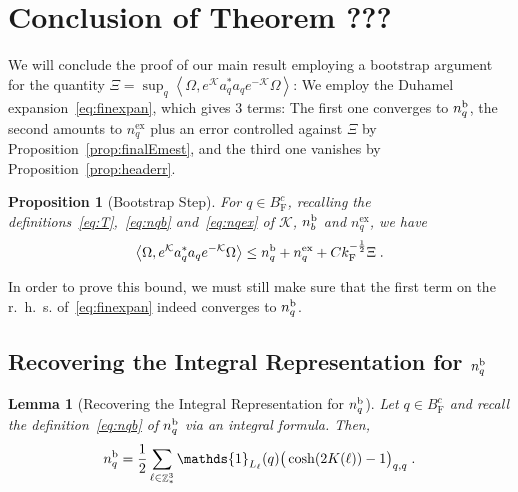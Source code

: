 \documentclass[12pt,a4paper]{article}
\numberwithin{equation}{section}
\newcommand{\cK}{\mathcal{K}}
\newcommand{\1}{\mathbb{I}}
\renewcommand{\b}{\textnormal{b}}
\newcommand{\ex}{\mathrm{ex}}
\newcommand{\F}{\mathrm{F}}
\DeclareMathOperator{\Z}{\mathbb{Z}}
\newcommand{\half}{\frac{1}{2}}
\newcommand{\eva}[1]{\left\langle #1 \right\rangle}
\theoremstyle{plain}
\newtheorem{lemma}[theorem]{Lemma}
\newtheorem{proposition}[theorem]{Proposition}
\theoremstyle{definition}
\theoremstyle{remark}
\theoremstyle{plain}
\theoremstyle{definition}
\theoremstyle{remark}
\begin{document}


\section{Conclusion of Theorem ???}

We will conclude the proof of our main result employing a bootstrap argument for the quantity $ \Xi = \sup_q \eva{\Omega, e^{\cK} a_q^* a_q e^{-\cK} \Omega}  $: We employ the Duhamel expansion~\eqref{eq:finexpan}, which gives 3 terms: The first one converges to $ n_q^{\b} $, the second amounts to $ n_q^{\ex} $ plus an error controlled against $ \Xi $ by Proposition~\ref{prop:finalEmest}, and the third one vanishes by Proposition~\ref{prop:headerr}.

\begin{proposition}[Bootstrap Step] \label{prop:bootstrap}
For $q \in B^c_{\F}$, recalling the definitions~\eqref{eq:T},~\eqref{eq:nqb} and~\eqref{eq:nqex} of $ \cK $, $ n_b^{\b} $ and $ n_q^{\ex} $, we have
\begin{equation} \label{eq:bootstrap}
	\eva{\Omega, e^{\cK} a_q^* a_q e^{-\cK} \Omega} 
	\le n_q^{\b} + n_q^{\ex} + C k_{\F}^{-\half} \Xi \;.
\end{equation} 
\end{proposition} 

In order to prove this bound, we must still make sure that the first term on the r.~h.~s. of~\eqref{eq:finexpan} indeed converges to $ n_q^{\b} $.


\subsection{Recovering the Integral Representation for $ n_q^{\b} $}

\begin{lemma}[Recovering the Integral Representation for $ n_q^{\b} $] \label{lem:nqb_integralrecovery}
Let $q \in B^c_{\F}$ and recall the definition~\eqref{eq:nqb} of $ n_q^{\b} $ via an integral formula. Then,
\begin{equation} \label{eq:nqb_integralrecovery}
	n_q^{\b} = \half\sum\limits_{\ell\in \Z^3_*}\mathds{1}_{L_\ell}(q) \big( \cosh(2K(\ell)) - 1 \big)_{q,q} \;.
\end{equation}
\end{lemma}
\end{document}
